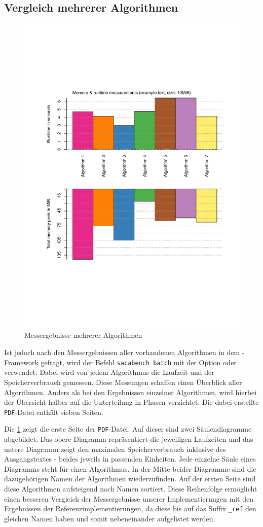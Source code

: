\subsection{Vergleich mehrerer Algorithmen}
\label{framework:bechmark:sacabench-batch}

\begin{figure}
	\includegraphics[page = 1, width=.5\textwidth]{kapitel/3_framework/benchmark/sacabench-batch/beispiel_batch_saeule.pdf}
	\caption{Messergebnisse mehrerer Algorithmen}
	\label{pdf:benchmark:batch:saeule}
\end{figure}

Ist jedoch nach den Messergebnissen aller vorhandenen Algorithmen in dem \sacabench-Framework gefragt, wird der Befehl \texttt{sacabench batch} mit der Option  oder  verwendet. Dabei wird von jedem Algorithmus die Laufzeit und der Spei\-cher\-ver\-brauch gemessen. Diese Messungen schaffen einen Überblick aller Algorithmen. Anders als bei den Ergebnissen einzelner Algorithmen, wird hierbei der Übersicht halber auf die Unterteilung in Phasen verzichtet. Die dabei erstellte \texttt{PDF}-Datei enthält sieben Seiten.

Die \cref{pdf:benchmark:batch:saeule} zeigt die erste Seite der \texttt{PDF}-Datei. Auf dieser sind zwei Säulendiagramme abgebildet. Das obere Diagramm repräsentiert die jeweiligen Laufzeiten und das untere Diagramm zeigt den maximalen Spei\-cher\-ver\-brauch inklusive des Ausgangstextes - beides jeweils in passenden Einheiten. Jede einzelne Säule eines Diagramms steht für einen Algorithmus. In der Mitte beider Diagramme sind die dazugehörigen Namen der Algorithmen wiederzufinden. Auf der ersten Seite sind diese Algorithmen aufsteigend nach Namen sortiert. Diese Reihenfolge ermöglicht einen besseren Vergleich der Messergebnisse unserer Implementierungen mit den Ergebnissen der Referenzimplementierungen, da diese bis auf das Suffix \texttt{\_ref} den gleichen Namen haben und somit nebeneinander aufgelistet werden.

